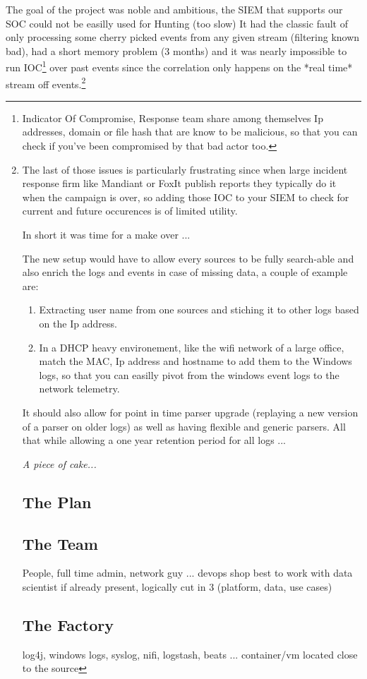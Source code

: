 \documentclass[a4paper,12pt]{article}
\begin{document}
The goal of the project was noble and ambitious, the SIEM that supports our SOC could not be easilly used for Hunting (too slow) 
It had the classic fault of only processing some cherry picked events from any given stream (filtering known bad), had a short memory problem (3 months) and it was nearly impossible 
to run IOC\footnote{Indicator Of Compromise, Response team share among themselves Ip addresses, domain or file hash that are know to be malicious, so that you can check if you've been compromised by that bad actor too.} over past events since the correlation only happens on the *real time* stream off events.\footnote{The last of those issues is particularly frustrating since when large incident response firm like Mandiant or FoxIt publish reports they typically do it when the campaign is over, so adding those IOC to your SIEM to check for current and future occurences is of limited utility.

In short it was time for a make over ... 

The new setup would have to allow every sources to be fully search-able and also enrich the logs and events in case of missing data, a couple of example are:
\begin{enumerate}
	\item Extracting user name from one sources and stiching it to other logs based on the Ip address.
	\item In a DHCP heavy environement, like the wifi network of a large office, match the MAC, Ip address and hostname to add them to the Windows logs, so that you can easilly pivot from the windows event logs to the network telemetry.
\end{enumerate}

It should also allow for point in time parser upgrade (replaying a new  version of a parser on older logs) as well as having flexible and generic parsers. 
All that while allowing a one year retention period for all logs ...

\emph{A piece of cake...}
\newpage
\section{The Plan}
\subsection{The Team}
People, full time admin, network guy ... devops shop
best to work with data scientist if already present, logically cut in 3 (platform, data, use cases)
\subsection{The Factory}
log4j, windows logs, syslog, nifi, logstash, beats ...
container/vm located close to the source
}
\end{document}
